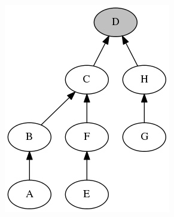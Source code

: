 \begin{figure}[H]
{\begin{subfigure}[b]{0.2\textwidth}
            \caption{}\label{fig:network_events_locations_examples_2}
        \end{subfigure}%
        \begin{subfigure}[b]{0.3\textwidth}
            \includegraphics[width=\textwidth]{./figures/methodology/spatial_time_correlation/graph3.png}
            \caption{}\label{fig:network_events_locations_examples_3}
        \end{subfigure}
        \begin{subfigure}[b]{0.3\textwidth}

\end{subfigure}}
\end{figure}
